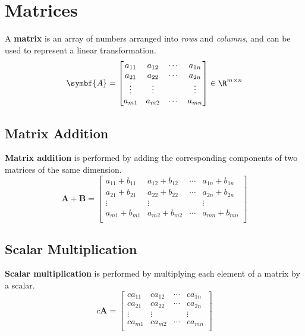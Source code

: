 \documentclass{article}
\begin{document}
\section{Matrices}
\begin{definition}
    A \textbf{matrix} is an array of numbers arranged into \textit{rows}
    and \textit{columns}, and can be used to represent a linear
    transformation.
    \begin{equation*}
        \symbf{A} =
        \begin{bmatrix}
            a_{11} & a_{12} & \cdots & a_{1n} \\
            a_{21} & a_{22} & \cdots & a_{2n} \\
            \vdots & \vdots &        & \vdots \\
            a_{m1} & a_{m2} & \cdots & a_{mn} \\
        \end{bmatrix}
        \in \R^{m \times n}
    \end{equation*}
\end{definition}
\subsection{Matrix Addition}
\begin{definition}
    \textbf{Matrix addition} is performed by adding the corresponding
    components of two matrices of the same dimension.
    \begin{equation*}
        \symbf{A} + \symbf{B} =
        \begin{bmatrix}
            a_{11} + b_{11} & a_{12} + b_{12} & \cdots & a_{1n} + b_{1n} \\
            a_{21} + b_{21} & a_{22} + b_{22} & \cdots & a_{2n} + b_{2n} \\
            \vdots          & \vdots          &        & \vdots          \\
            a_{m1} + b_{m1} & a_{m2} + b_{m2} & \cdots & a_{mn} + b_{mn} \\
        \end{bmatrix}
    \end{equation*}
\end{definition}
\subsection{Scalar Multiplication}
\begin{definition}
    \textbf{Scalar multiplication} is performed by multiplying each
    element of a matrix by a scalar.
    \begin{equation*}
        c\symbf{A} =
        \begin{bmatrix}
            ca_{11} & ca_{12} & \cdots & ca_{1n} \\
            ca_{21} & ca_{22} & \cdots & ca_{2n} \\
            \vdots  & \vdots  &        & \vdots  \\
            ca_{m1} & ca_{m2} & \cdots & ca_{mn} \\
        \end{bmatrix}
    \end{equation*}
\end{definition}
\end{document}
